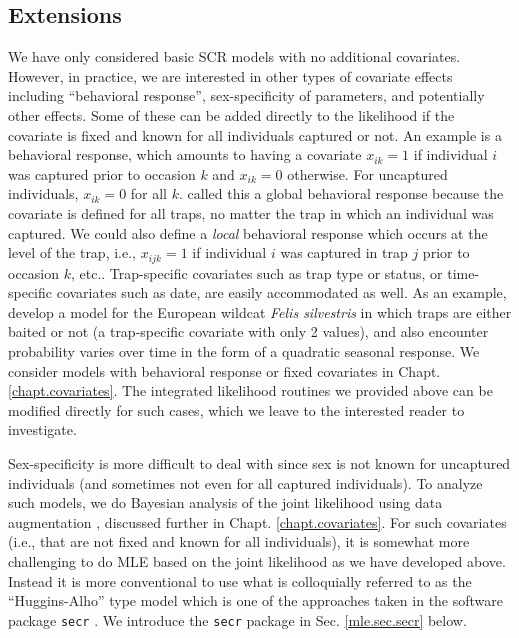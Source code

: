 \subsection{Extensions}

We have only considered basic SCR models with no additional
covariates. However, in practice, we are interested in other types of
covariate effects including ``behavioral response'', 
sex-specificity of parameters, and potentially other effects. Some of
these  can be added directly to the likelihood if the covariate is fixed
and known for all individuals captured or not. An example is a
behavioral response, which amounts to having a covariate $x_{ik}=1$ if
individual $i$ was captured prior to occasion $k$ and $x_{ik}=0$
otherwise. For uncaptured individuals, $x_{ik}=0$ for all $k$.
 \citet{royle_etal:2011jwm} called this a global behavioral
response because the covariate is defined for all traps, no matter the
trap in which an individual was captured. We could also define a {\it
  local} behavioral response which occurs at the level of the trap,
i.e., $x_{ijk}=1$ if individual $i$ was captured in trap $j$ prior to
occasion $k$, etc.. 
Trap-specific covariates such as trap type or status, or
time-specific covariates such as date, are easily accommodated as
well. As an example, \citet{kery_etal:2010} develop a model for the
European wildcat \emph{Felis silvestris}  in which traps are either baited or not (a
trap-specific covariate with only 2 values), and also encounter
probability varies over time in the form of a quadratic seasonal response.
We consider models with behavioral response or fixed covariates in
Chapt. \ref{chapt.covariates}.
The integrated likelihood routines we provided above can be
modified directly for such cases, which we leave to the interested
reader to investigate. 

Sex-specificity is more difficult to deal with since sex is not known
for uncaptured individuals (and sometimes not even for all captured
individuals).  To analyze such models, we do Bayesian analysis of the
joint likelihood using  data augmentation
\citep{gardner_etal:2010jwm,russell_etal:2012}, discussed further in
Chapt. \ref{chapt.covariates}. For such covariates (i.e., that are
not fixed and known for all individuals), it is somewhat more
challenging to do MLE based on the joint likelihood as we
have developed above. Instead it is more conventional to use what is
colloquially referred to as the ``Huggins-Alho'' type model which is
one of the approaches taken in the software package \mbox{\tt secr}
\citep[][]{efford:2011}. 
 We introduce the  \mbox{\tt secr} package 
in Sec. \ref{mle.sec.secr} below. 



